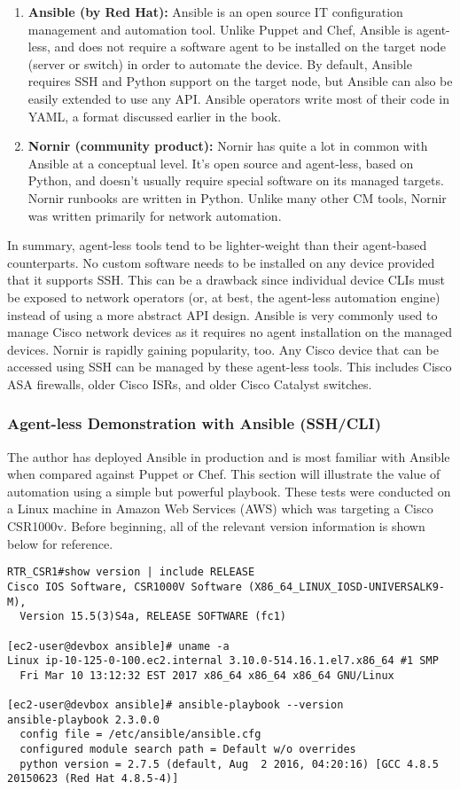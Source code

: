 \begin{enumerate}
  \item \textbf{Ansible (by Red Hat):} Ansible is an open source IT
  configuration management and automation tool. Unlike Puppet and Chef,
  Ansible is agent-less, and does not require a software agent to be installed
  on the target node (server or switch) in order to automate the device. By
  default, Ansible requires SSH and Python support on the target node, but
  Ansible can also be easily extended to use any API\@. Ansible
  operators
  write most of their code in YAML, a format discussed earlier in the book.
  \item \textbf{Nornir (community product):} Nornir has quite a lot in
  common with Ansible at a conceptual level. It's open source and agent-less,
  based on Python, and doesn't usually require special software on its
  managed targets. Nornir runbooks are written in Python. Unlike many
  other CM tools, Nornir was written primarily for network automation.
\end{enumerate}

In summary, agent-less tools tend to be lighter-weight than their agent-based
counterparts. No custom software needs to be installed on any
device provided that it supports SSH\@. This can be a drawback since individual
device CLIs must be exposed to network operators (or, at best, the agent-less
automation engine) instead of using a more abstract API design. Ansible is
very commonly used to manage Cisco network devices as it requires no agent
installation on the managed devices. Nornir is rapidly gaining popularity, too.
Any Cisco device that can be accessed using SSH can be managed by these
agent-less tools. This includes Cisco ASA firewalls, older Cisco ISRs, and
older Cisco Catalyst switches.

\subsubsection{Agent-less Demonstration with Ansible (SSH/CLI)}
The author has deployed Ansible in production and is most familiar with
Ansible when compared against Puppet or Chef. This section will illustrate the
value of automation using a simple but powerful playbook. These tests were
conducted on a Linux machine in Amazon Web Services (AWS) which was targeting
a Cisco CSR1000v. Before beginning, all of the relevant version information is
shown below for reference.

\begin{verbatim}
RTR_CSR1#show version | include RELEASE  
Cisco IOS Software, CSR1000V Software (X86_64_LINUX_IOSD-UNIVERSALK9-M),
  Version 15.5(3)S4a, RELEASE SOFTWARE (fc1)

[ec2-user@devbox ansible]# uname -a
Linux ip-10-125-0-100.ec2.internal 3.10.0-514.16.1.el7.x86_64 #1 SMP
  Fri Mar 10 13:12:32 EST 2017 x86_64 x86_64 x86_64 GNU/Linux

[ec2-user@devbox ansible]# ansible-playbook --version
ansible-playbook 2.3.0.0
  config file = /etc/ansible/ansible.cfg
  configured module search path = Default w/o overrides
  python version = 2.7.5 (default, Aug  2 2016, 04:20:16) [GCC 4.8.5 20150623 (Red Hat 4.8.5-4)]
\end{verbatim}


